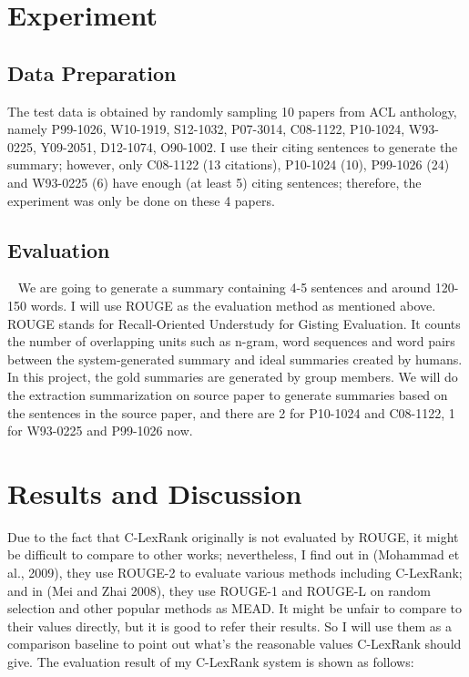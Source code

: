 \documentclass[hyp]{socreport}
\begin{document}
\section{Experiment}

\subsection{Data Preparation}
  The test data is obtained by randomly sampling 10 papers from ACL anthology, namely P99-1026, W10-1919, S12-1032, P07-3014, C08-1122,
P10-1024, W93-0225, Y09-2051, D12-1074, O90-1002. I use their citing sentences to generate the summary; however, only 
C08-1122 (13 citations), P10-1024 (10), P99-1026 (24) and W93-0225 (6) have enough (at least 5) citing sentences; therefore, the experiment was only be done on these 4 papers.

\subsection{Evaluation}
  We are going to generate a summary containing 4-5 sentences and around 120-150 words. 
I will use ROUGE as the evaluation method as mentioned above. ROUGE stands for Recall-Oriented Understudy for Gisting Evaluation.
It counts the number of overlapping units such 
as n-gram, word sequences and word pairs between the system-generated summary and ideal summaries created by humans.
In this project, 
the gold summaries are generated by group members. We will do the extraction summarization on source paper to generate summaries 
based on the sentences in the source paper, and there are 2 for P10-1024 and C08-1122, 1 for W93-0225 and P99-1026 now.

\section{Results and Discussion}

  Due to the fact that C-LexRank originally is not evaluated by ROUGE, it might be difficult to compare to other works; 
nevertheless, I find out in (Mohammad et al., 2009), they use ROUGE-2 to evaluate various methods including C-LexRank; 
and in (Mei and Zhai 2008), they use ROUGE-1 and ROUGE-L on random selection and other popular methods as MEAD. It might 
be unfair to compare to their values directly, but it is good to refer their results. So I will use them as a comparison 
baseline to point out what's the reasonable values C-LexRank should give. The evaluation result of my C-LexRank system is 
shown as follows:
\end{document}
